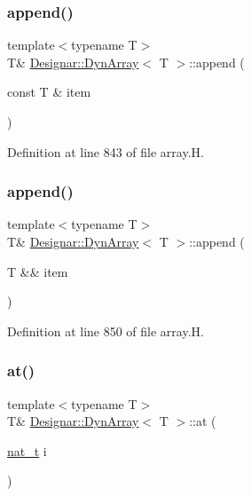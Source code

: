 \subsubsection{\texorpdfstring{append()}{append()}\hspace{0.1cm}{\footnotesize\ttfamily [1/2]}}
{\footnotesize\ttfamily template$<$typename T$>$ \\
T\& \hyperlink{class_designar_1_1_dyn_array}{Designar\+::\+Dyn\+Array}$<$ T $>$\+::append (\begin{DoxyParamCaption}\item[{const T \&}]{item }\end{DoxyParamCaption})\hspace{0.3cm}{\ttfamily [inline]}}



Definition at line 843 of file array.\+H.

\mbox{\label{class_designar_1_1_dyn_array_a0e1583bf9d554b5553438dffd57bff93}} 
\subsubsection{\texorpdfstring{append()}{append()}\hspace{0.1cm}{\footnotesize\ttfamily [2/2]}}
{\footnotesize\ttfamily template$<$typename T$>$ \\
T\& \hyperlink{class_designar_1_1_dyn_array}{Designar\+::\+Dyn\+Array}$<$ T $>$\+::append (\begin{DoxyParamCaption}\item[{T \&\&}]{item }\end{DoxyParamCaption})\hspace{0.3cm}{\ttfamily [inline]}}



Definition at line 850 of file array.\+H.

\mbox{\label{class_designar_1_1_dyn_array_a117ba8cd3a9275b36d713a0ef3aef0e3}} 
\subsubsection{\texorpdfstring{at()}{at()}\hspace{0.1cm}{\footnotesize\ttfamily [1/2]}}
{\footnotesize\ttfamily template$<$typename T$>$ \\
T\& \hyperlink{class_designar_1_1_dyn_array}{Designar\+::\+Dyn\+Array}$<$ T $>$\+::at (\begin{DoxyParamCaption}\item[{\hyperlink{namespace_designar_aa72662848b9f4815e7bf31a7cf3e33d1}{nat\+\_\+t}}]{i }\end{DoxyParamCaption})\hspace{0.3cm}{\ttfamily [inline]}}



